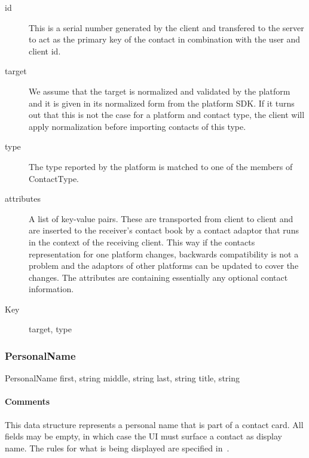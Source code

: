 \documentclass[a4paper,10pt]{article}
\begin{document}
\SpecialItem
\begin{description}
 \item[id] This is a serial number generated by the client and transfered to the server to act as the primary key of the contact in combination with the user and client id.
 \item[target] We assume that the target is normalized and validated by the platform and it is given in its normalized form from the platform SDK. If it turns out that this is not 
the case for a platform and contact type, the client will apply normalization before importing contacts of this type.
 \item[type] The type reported by the platform is matched to one of the members of ContactType.
 \item[attributes] A list of key-value pairs. These are transported from client to client and are inserted to the receiver's contact book by a contact adaptor that runs in the 
context of the receiving client. This way if the contacts representation for one platform changes, backwards compatibility is not a problem and the adaptors of other platforms can 
be updated to cover the changes. The attributes are containing essentially any optional contact information.
\end{description}

\SpecialItem
\begin{description}
 \item[Key] target, type
\end{description}

\subsubsection{PersonalName}

\begin{verbbox}
PersonalName
{
  first, string
  middle, string
  last, string
  title, string
}
\end{verbbox}
\begin{center}
\theverbbox
\end{center}

\begin{inparaitem}[ ]
 \item \infrastructure
\end{inparaitem}

\paragraph*{Comments}
This data structure represents a personal name that is part of a contact card. All fields may be empty, in which case the UI must surface a contact as display name. The rules 
for what is being displayed are specified in~\cite{flow_spec}.
\end{document}

